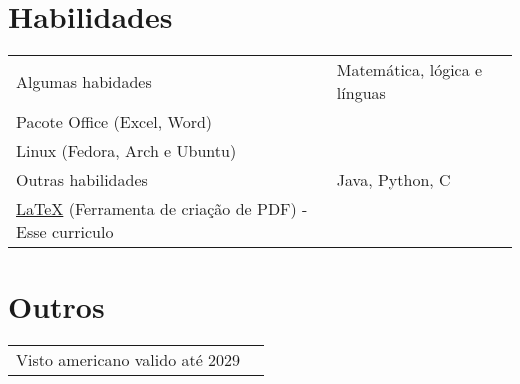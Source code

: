 \documentclass[a4paper,12pt]{article}
\begin{document}
\section{Habilidades}
\begin{tabularx}{\linewidth}{@{}l X@{}}
Algumas habidades &  \normalsize{Matemática, lógica e línguas}\\
\normalsize{Pacote Office (Excel, Word)}\\ 
\normalsize{Linux (Fedora, Arch e Ubuntu)}  \\
Outras habilidades  &  \normalsize{ Java, Python, C}\\ 
\href{https://www.latex-project.org/}{\LaTeX} (Ferramenta de criação de PDF) - Esse curriculo
\end{tabularx}
\section{Outros}
\begin{tabularx}{\linewidth}{@{}l X@{}}
    {Visto americano valido até 2029}
\end{tabularx}
\vfill
{}
\end{document}
